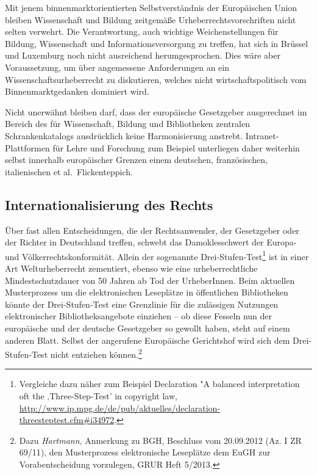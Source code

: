 \documentclass[output=paper]{langscibook}
\begin{document}
\noindent Mit jenem binnenmarktorientierten Selbstverständnis der Europäischen
Union bleiben Wissenschaft und Bildung zeitgemäße
Urheberrechtsvorschriften nicht selten verwehrt. Die Verantwortung, auch
wichtige Weichenstellungen für Bildung, Wissenschaft und
Informationsversorgung zu treffen, hat sich in Brüssel und Luxemburg
noch nicht ausreichend herumgesprochen. Dies wäre aber Voraussetzung, um
über angemessene Anforderungen an ein Wissenschaftsurheberrecht zu
diskutieren, welches nicht wirtschaftspolitisch vom Binnenmarktgedanken
dominiert wird.

Nicht unerwähnt bleiben darf, dass der europäische Gesetzgeber
ausgerechnet im Bereich des für Wissenschaft, Bildung und Bibliotheken
zentralen Schrankenkatalogs ausdrücklich keine Harmonisierung anstrebt.
Intranet-Plattformen für Lehre und Forschung zum Beispiel unterliegen
daher weiterhin selbst innerhalb europäischer Grenzen einem deutschen,
französischen, italienischen et al.~Flickenteppich.

\hypertarget{internationalisierung-des-rechts}{%
\subsection{Internationalisierung des
Rechts}\label{internationalisierung-des-rechts}}

Über fast allen Entscheidungen, die der Rechtsanwender, der Gesetzgeber
oder der Richter in Deutschland treffen, schwebt das Damoklesschwert der
Europa- und Völkerrechtskonformität. Allein der sogenannte
Drei-Stufen-Test\footnote{Vergleiche dazu näher zum Beispiel Declaration "A
  balanced interpretation oft the ‚Three-Step-Test' in copyright law,
  \url{http://www.ip.mpg.de/de/pub/aktuelles/declaration-threesteptest.cfm\#i34972}.}
ist in einer Art Welturheberrecht zementiert, ebenso wie eine
urheberrechtliche Mindestschutzdauer von 50 Jahren ab Tod der
UrheberInnen. Beim aktuellen Musterprozess um die elektronischen
Leseplätze in öffentlichen Bibliotheken könnte der Drei-Stufen-Test eine
Grenzlinie für die zulässigen Nutzungen elektronischer
Bibliotheksangebote einziehen -- ob diese Fesseln nun der europäische
und der deutsche Gesetzgeber so gewollt haben, steht auf einem anderen
Blatt. Selbst der angerufene Europäische Gerichtshof wird sich dem
Drei-Stufen-Test nicht entziehen können.\footnote{Dazu \emph{Hartmann},
  Anmerkung zu BGH, Beschluss vom 20.09.2012 (Az. I ZR 69/11), den
  Musterprozess elektronische Leseplätze dem EuGH zur Vorabentscheidung
  vorzulegen, GRUR Heft 5/2013.}
\end{document}
